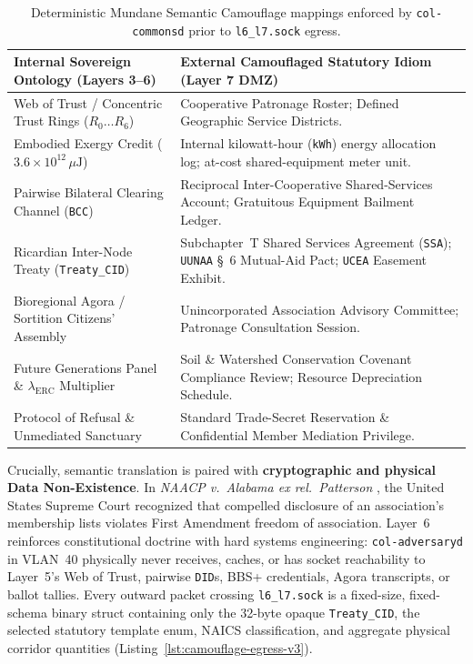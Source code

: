 \begin{table}[htbp]
\centering
\caption{Deterministic Mundane Semantic Camouflage mappings enforced by \texttt{col-commonsd} prior to \texttt{l6\_l7.sock} egress.}
\label{tab:mundane-camouflage-v31}
\footnotesize
\begin{tabular}{@{}p{}p{}@{}}
\toprule
\textbf{Internal Sovereign Ontology (Layers 3--6)} & \textbf{External Camouflaged Statutory Idiom (Layer 7 DMZ)} \\
\midrule
Web of Trust / Concentric Trust Rings ($R_0 \dots R_6$) & Cooperative Patronage Roster; Defined Geographic Service Districts. \\
\addlinespace[3pt]
Embodied Exergy Credit ($3.6 \times 10^{12}\,\mu\mathrm{J}$) & Internal kilowatt-hour (\texttt{kWh}) energy allocation log; at-cost shared-equipment meter unit. \\
\addlinespace[3pt]
Pairwise Bilateral Clearing Channel (\texttt{BCC}) & Reciprocal Inter-Cooperative Shared-Services Account; Gratuitous Equipment Bailment Ledger. \\
\addlinespace[3pt]
Ricardian Inter-Node Treaty (\texttt{Treaty\_CID}) & Subchapter~T Shared Services Agreement (\texttt{SSA}); \texttt{UUNAA} \S~6 Mutual-Aid Pact; \texttt{UCEA} Easement Exhibit. \\
\addlinespace[3pt]
Bioregional Agora / Sortition Citizens' Assembly & Unincorporated Association Advisory Committee; Patronage Consultation Session. \\
\addlinespace[3pt]
Future Generations Panel \& $\lambda_{\mathrm{ERC}}$ Multiplier & Soil \& Watershed Conservation Covenant Compliance Review; Resource Depreciation Schedule. \\
\addlinespace[3pt]
Protocol of Refusal \& Unmediated Sanctuary & Standard Trade-Secret Reservation \& Confidential Member Mediation Privilege. \\
\bottomrule
\end{tabular}
\end{table}

Crucially, semantic translation is paired with \textbf{cryptographic and physical Data Non-Existence}. In \emph{NAACP v.\ Alabama ex rel.\ Patterson} \parencite{naacp1958}, the United States Supreme Court recognized that compelled disclosure of an association's membership lists violates First Amendment freedom of association. Layer~6 reinforces constitutional doctrine with hard systems engineering: \texttt{col-adversaryd} in VLAN~40 physically never receives, caches, or has socket reachability to Layer~5's Web of Trust, pairwise \texttt{DID}s, BBS+ credentials, Agora transcripts, or ballot tallies. Every outward packet crossing \texttt{l6\_l7.sock} is a fixed-size, fixed-schema binary struct containing only the 32-byte opaque \texttt{Treaty\_CID}, the selected statutory template enum, NAICS classification, and aggregate physical corridor quantities (Listing~\ref{lst:camouflage-egress-v3}).

